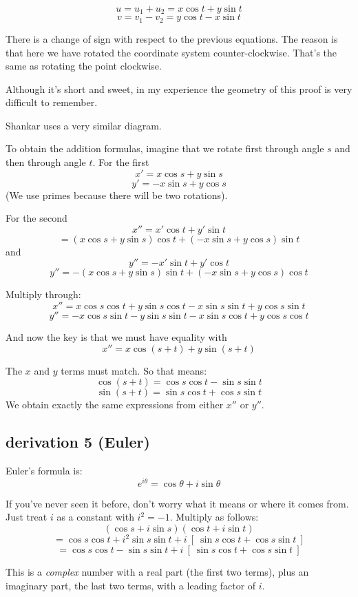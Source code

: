 \documentclass[11pt, oneside]{article}
\begin{document}
\[ u = u_1 + u_2 = x \cos t + y \sin t \]
\[ v = v_1 - v_2 = y \cos t - x \sin t  \]

There is a change of sign with respect to the previous equations.  The reason is that here we have rotated the coordinate system counter-clockwise.  That's the same as rotating the point clockwise.

Although it's short and sweet, in my experience the geometry of this proof is very difficult to remember.

Shankar uses a very similar diagram.

To obtain the addition formulas, imagine that we rotate first through angle $s$ and then through angle $t$.  For the first
\[ x' = x \cos s + y \sin s \]
\[ y' = - x \sin s + y \cos s \]
(We use primes because there will be two rotations).

For the second
\[ x'' = x' \cos t + y' \sin t \]
\[ = (x \cos s + y \sin s) \cos t + (-x \sin s + y \cos s) \sin t \]
and
\[ y'' = - x' \sin t + y' \cos t \]
\[ y'' = -(x \cos s + y \sin s) \sin t + (-x \sin s + y \cos s) \cos t \]

Multiply through:
\[ x'' = x \cos s \cos t + y \sin s \cos t - x \sin s \sin t + y \cos s \sin t \]
\[ y'' = -x \cos s \sin t - y \sin s \sin t - x \sin s \cos t + y \cos s \cos t \]

And now the key is that we must have equality with
\[ x'' = x \cos (s + t) + y \sin (s + t) \]

The $x$ and $y$ terms must match.  So that means:
\[ \cos (s + t) = \cos s \cos t - \sin s \sin t \]
\[ \sin (s + t) = \sin s \cos t + \cos s \sin t \]
We obtain exactly the same expressions from either $x''$ or $y''$.

\subsection*{derivation 5 (Euler)}
Euler's formula is:
\[ e^{i \theta} = \cos \theta + i \sin \theta \]

If you've never seen it before, don't worry what it means or where it comes from.  Just treat $i$ as a constant with $i^2 = -1$.  Multiply as follows:
\[ (\cos s + i \sin s)(\cos t + i \sin t) \]
\[ = \cos s \cos t + i^2 \sin s \sin t + i \ [ \ \sin s \cos t + \cos s \sin t \ ] \] 
\[ = \cos s \cos t - \sin s \sin t + i \ [ \ \sin s \cos t + \cos s \sin t \ ] \] 

This is a \emph{complex} number with a real part (the first two terms), plus an imaginary part, the last two terms, with a leading factor of $i$.
\end{document}
